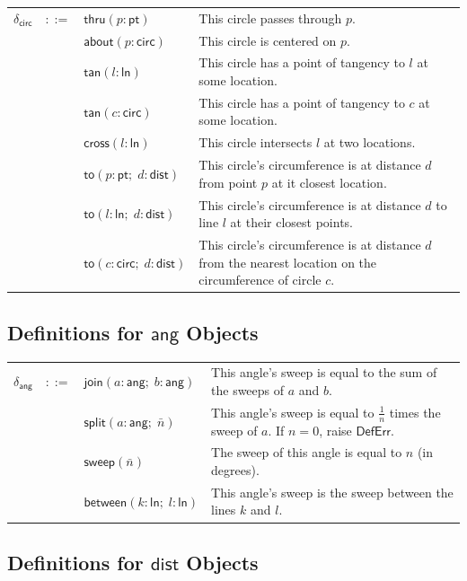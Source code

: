 \documentclass[twoside,11pt]{report}
\begin{document}
\begin{tabularx}{\textwidth}{l l l X}
$\delta_{\mathsf{circ}}$ & $::=$ & $\mathsf{thru}(p : \mathsf{pt})$ & This circle passes through $p$. \\
 & & $\mathsf{about}(p : \mathsf{circ})$ & This circle is centered on $p$. \\
 & & $\mathsf{tan}(l : \mathsf{ln})$ & This circle has a point of tangency to $l$ at some location. \\
 & & $\mathsf{tan}(c : \mathsf{circ})$ & This circle has a point of tangency to $c$ at some location. \\
 & & $\mathsf{cross}(l : \mathsf{ln})$ & This circle intersects $l$ at two locations. \\
 & & $\mathsf{to}(p : \mathsf{pt}; \; d : \mathsf{dist})$ & This circle's circumference is at distance $d$ from point $p$ at it closest location. \\
 & & $\mathsf{to}(l : \mathsf{ln}; \; d : \mathsf{dist})$ & This circle's circumference is at distance $d$ to line $l$ at their closest points. \\
 & & $\mathsf{to}(c : \mathsf{circ}; \; d : \mathsf{dist})$ & This circle's circumference is at distance $d$ from the nearest location on the circumference of circle $c$. \\
\end{tabularx}

\subsection{Definitions for $\mathsf{ang}$ Objects}
\label{subsec:def-ang}

\begin{tabularx}{\textwidth}{l l l X}
$\delta_{\mathsf{ang}}$ & $::=$ & $\mathsf{join}(a : \mathsf{ang}; \; b : \mathsf{ang})$ & This angle's sweep is equal to the sum of the sweeps of $a$ and $b$. \\
 & & $\mathsf{split}(a : \mathsf{ang}; \; \bar{n})$ & This angle's sweep is equal to $\frac{1}{n}$ times the sweep of $a$. If $n = 0$, raise $\mathsf{DefErr}$. \\
 & & $\mathsf{sweep}(\bar{n})$ & The sweep of this angle is equal to $n$ (in degrees). \\
 & & $\mathsf{between}(k : \mathsf{ln}; \; l : \mathsf{ln})$ & This angle's sweep is the sweep between the lines $k$ and $l$. \\
\end{tabularx}

\subsection{Definitions for $\mathsf{dist}$ Objects}
\label{subsec:def-dist}
\end{document}
